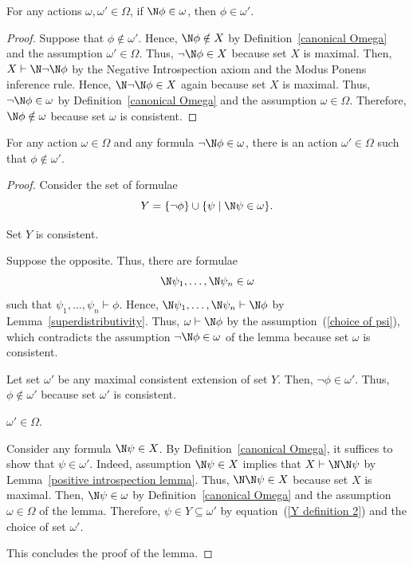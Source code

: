 \documentclass[letterpaper]{article}
\begin{document}
\begin{lemma}\label{N child all}
For any actions $\omega,\omega'\in\Omega$, if $\N\phi\in\omega$, then $\phi\in\omega'$. 
\end{lemma}
\begin{proof}
Suppose that $\phi\notin\omega'$.  Hence, $\N\phi\notin X$ by Definition~\ref{canonical Omega} and the assumption $\omega'\in\Omega$. Thus, $\neg\N\phi\in X$ because set $X$ is maximal. Then, $X\vdash\N\neg\N\phi$ by the Negative Introspection axiom and the Modus Ponens inference rule. Hence, $\N\neg\N\phi\in X$ again because set $X$ is maximal. Thus, $\neg\N\phi\in\omega$ by Definition~\ref{canonical Omega} and the assumption  $\omega\in\Omega$. Therefore, $\N\phi\notin \omega$ because set $\omega$ is consistent.
\end{proof}

\begin{lemma}\label{N child exists}
For any action $\omega\in\Omega$ and any formula $\neg\N\phi\in\omega$, there is an action $\omega'\in\Omega$ such that $\phi\notin\omega'$.
\end{lemma}
\begin{proof}
Consider the set of formulae
\begin{equation}\label{Y definition 2}
    Y = \{\neg\phi\}\cup\{\psi\;|\;\N\psi\in \omega\}.
\end{equation}
\begin{claim}
Set $Y$ is consistent.
\end{claim}
\begin{proof-of-claim}
Suppose the opposite. Thus, there are formulae
\begin{equation}\label{choice of psi}
    \N\psi_1,\dots,\N\psi_n\in \omega
\end{equation}
such that $\psi_1,\dots,\psi_n\vdash\phi$. Hence, $\N\psi_1,\dots,\N\psi_n\vdash\N\phi$ by Lemma~\ref{superdistributivity}. Thus, $\omega\vdash\N\phi$ by the assumption~(\ref{choice of psi}), which contradicts the assumption $\neg\N\phi\in\omega$ of the lemma because set $\omega$ is consistent.
\end{proof-of-claim}
Let set $\omega'$ be any maximal consistent extension of set $Y$. Then, $\neg\phi\in \omega'$. Thus, $\phi\notin \omega'$ because set $\omega'$ is consistent.

\begin{claim}
$\omega'\in \Omega$.
\end{claim}
\begin{proof-of-claim}
Consider any formula $\N\psi\in X$. By Definition~\ref{canonical Omega}, it suffices to show that $\psi\in\omega'$. Indeed, assumption  $\N\psi\in X$ implies that $X\vdash\N\N\psi$ by Lemma~\ref{positive introspection lemma}. Thus, $\N\N\psi\in X$ because set $X$ is maximal. Then, $\N\psi\in\omega$ by Definition~\ref{canonical Omega} and the assumption $\omega\in\Omega$ of the lemma. Therefore, $\psi\in Y\subseteq \omega'$ by equation~(\ref{Y definition 2}) and the choice of set $\omega'$.
\end{proof-of-claim}
This concludes the proof of the lemma.
\end{proof}
\end{document}
